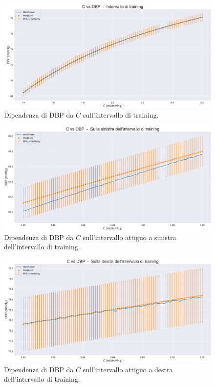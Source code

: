 \vspace{0.32cm}

\begin{figure}[!htb]
    \centering
    \includegraphics[width=1\textwidth]{images/Training (risultati)/DBP/DBP - C - training.pdf}
    \caption{Dipendenza di DBP da $C$ sull'intervallo di training.}
    \label{DBP - C - training}
\end{figure}



\begin{figure}
    \centering
    \includegraphics[width=1\textwidth]{images/Training (risultati)/DBP/DBP - C - sx.pdf}
    \caption{Dipendenza di DBP da $C$ sull'intervallo attiguo a sinistra dell'intervallo di training.}
    \label{DBP - C - sx}
\end{figure}


\begin{figure}
    \centering
    \includegraphics[width=1\textwidth]{images/Training (risultati)/DBP/DBP - C - dx.pdf}
    \caption{Dipendenza di DBP da $C$ sull'intervallo attiguo a destra dell'intervallo di training.}
    \label{DBP - C - dx}
\end{figure}


